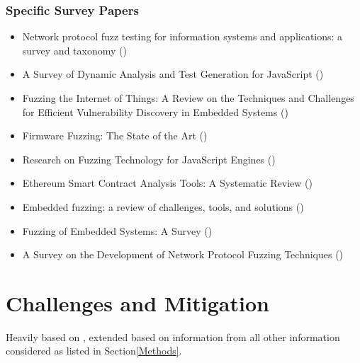 \documentclass{article}
\begin{document}
\begin{multicols}{2}
    \subsubsection{Specific Survey Papers}
    \begin{itemize}
        \item    Network protocol fuzz testing for information systems and applications: a survey and taxonomy ()\cite{Network}
        \item    A Survey of Dynamic Analysis and Test Generation for JavaScript ()\cite{JavaScript2}
        \item    Fuzzing the Internet of Things: A Review on the Techniques and Challenges for Efficient Vulnerability Discovery in Embedded Systems ()\cite{IoT}
        \item    Firmware Fuzzing: The State of the Art ()\cite{Firmware}
        \item    Research on Fuzzing Technology for JavaScript Engines ()\cite{JavaScript}
        \item    Ethereum Smart Contract Analysis Tools: A Systematic Review ()\cite{Ethereum}
        \item    Embedded fuzzing: a review of challenges, tools, and solutions ()\cite{Embedded2}
        \item    Fuzzing of Embedded Systems: A Survey ()\cite{Embedded}
        \item    A Survey on the Development of Network Protocol Fuzzing Techniques ()\cite{Network2023}
    \end{itemize}

    \section{Challenges and Mitigation}
    Heavily based on \cite{ReviewThreeDecades, PreliminaryAssessment}, extended based on information from all other information considered as listed in Section\ref{Methods}.


\end{multicols}
\end{document}
